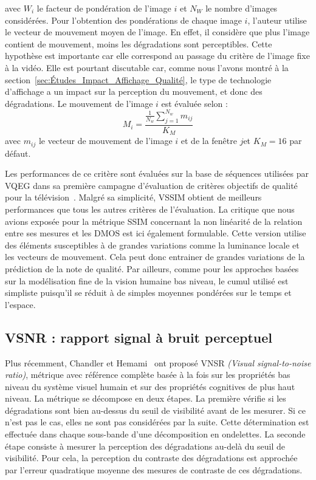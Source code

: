 %
avec $W_i$ le facteur de pondération de l'image $i$ et $N_W$ le nombre d'images considérées. Pour l'obtention des pondérations de chaque image $i$, l'auteur utilise le vecteur de mouvement moyen de l'image. En effet, il considère que plus l'image contient de mouvement, moins les dégradations sont perceptibles. Cette hypothèse est importante car elle correspond au passage du critère de l'image fixe à la vidéo. Elle est pourtant discutable car, comme nous l'avons montré à la section~\ref{sec:Études_Impact_Affichage_Qualité}, le type de technologie d'affichage a un impact sur la perception du mouvement, et donc des dégradations. Le mouvement de l'image $i$ est évaluée selon :
\begin{equation}
M_i = \dfrac{\frac{1}{N_w}\sum\limits_{j=1}^{N_w} m_{\mathit{ij}}}{K_M}
\end{equation}
%
avec $m_{\mathit{ij}}$ le vecteur de mouvement de l'image $i$ et de la fenêtre $j$et $K_M=16$ par défaut.

Les performances de ce critère sont évaluées sur la base de séquences utilisées par VQEG dans sa première campagne d'évaluation de critères objectifs de qualité pour la télévision~\cite{vqeg-frtv1}. Malgré sa simplicité, VSSIM obtient de meilleurs performances que tous les autres critères de l'évaluation. La critique que nous avions exposée pour la métrique SSIM concernant la non linéarité de la relation entre ses mesures et les DMOS est ici également formulable. Cette version utilise des éléments susceptibles à de grandes variations comme la luminance locale et les vecteurs de mouvement. Cela peut donc entrainer de grandes variations de la prédiction de la note de qualité. Par ailleurs, comme pour les approches basées sur la modélisation fine de la vision humaine bas niveau, le cumul utilisé est simpliste puisqu'il se réduit à de simples moyennes pondérées sur le temps et l'espace.


\subsection{VSNR : rapport signal à bruit perceptuel}
Plus récemment, Chandler et Hemami~\cite{chandler-vsnr} ont proposé VNSR \emph{(Visual signal-to-noise ratio)}, métrique avec référence complète basée à la fois sur les propriétés bas niveau du système visuel humain et sur des propriétés cognitives de plus haut niveau. La métrique se décompose en deux étapes. La première vérifie si les dégradations sont bien au-dessus du seuil de visibilité avant de les mesurer. Si ce n'est pas le cas, elles ne sont pas considérées par la suite. Cette détermination est effectuée dans chaque sous-bande d'une décomposition en ondelettes. La seconde étape consiste à mesurer la perception des dégradations au-delà du seuil de visibilité. Pour cela, la perception du contraste des dégradations est approchée par l'erreur quadratique moyenne des mesures de contraste de ces dégradations.

